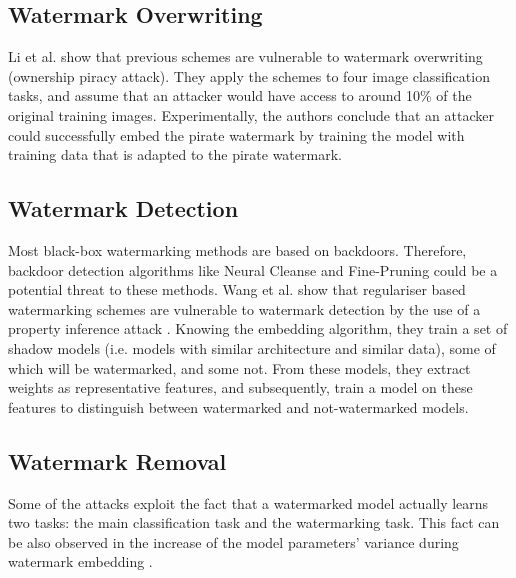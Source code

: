 \subsection{Watermark Overwriting}
Li et al. \cite{li_piracy_2020} show %
that previous schemes \cite{adi_turning_2018, zhang_protecting_2018} are vulnerable to watermark overwriting (ownership piracy attack).
They %
apply the schemes to
four image classification tasks, %
and assume that an attacker would have access to around 10\% of the %
original training images. Experimentally, the authors conclude that an attacker could successfully embed the pirate watermark by training the model with training data that is adapted to the pirate watermark.
  
\subsection{Watermark Detection}
Most black-box watermarking methods are based on backdoors. Therefore, backdoor detection algorithms like Neural Cleanse \cite{wang_neural_2019} and Fine-Pruning \cite{liu_fine-pruning_2018} could be a potential threat to these methods. Wang et al. \cite{wang_robust_2020} show that regulariser based watermarking schemes are vulnerable to watermark detection by the use of a property inference attack \cite{ganju_property_2018}.
Knowing the embedding algorithm, they train a set of shadow models (i.e. models with similar architecture and similar data), some of which will be watermarked, and some not.
From these models, they extract weights as representative features, and subsequently, train a model on these features to distinguish between watermarked and not-watermarked models.

\subsection{Watermark Removal}

Some of the attacks exploit the fact that a watermarked model actually learns two tasks: the main classification task and the watermarking task. This fact can be also observed in the increase of the model parameters' variance during watermark embedding \cite{wang_attacks_2019}.

